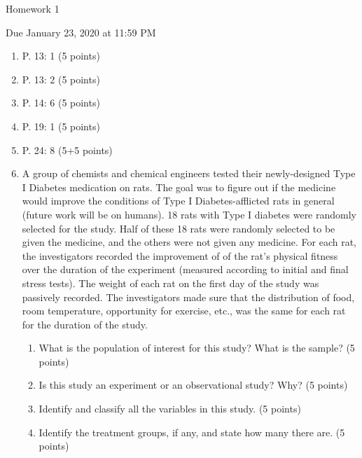 \documentclass{article}
\begin{document}
\begin{center} \LARGE
Homework 1 
\end{center}
\begin{center} \Large
Due January 23, 2020 at 11:59 PM 
\end{center}



\begin{enumerate}
	\item P. 13: 1 (5 points)
	\item P. 13: 2 (5 points)
	\item P. 14: 6 (5 points)
	\item P. 19: 1 (5 points)
	\item P. 24: 8 (5+5 points)
\item A group of chemists and chemical engineers tested their newly-designed Type I Diabetes medication on rats. The goal was to figure out if the medicine would improve the conditions of Type I Diabetes-afflicted rats in general (future work will be on humans). 18 rats with Type I diabetes were randomly selected for the study. Half of these 18 rats were randomly selected to be given the medicine, and the others were not given any medicine. For each rat, the investigators recorded the improvement of of the rat's physical fitness over the duration of the experiment (measured according to initial and final stress tests). The weight of each rat on the first day of the study was passively recorded. The investigators made sure that the distribution of food, room temperature, opportunity for exercise, etc., was the same for each rat for the duration of the study.

\begin{enumerate}
\item What is the population of interest for this study? What is the sample?
	(5 points)
\item Is this study an experiment or an observational study? Why? (5 points)
\item Identify and classify all the variables in this study. (5 points)
\item Identify the treatment groups, if any, and state how many there are. (5 points) 
\end{enumerate}

\end{enumerate}





% 
%
\end{document}
